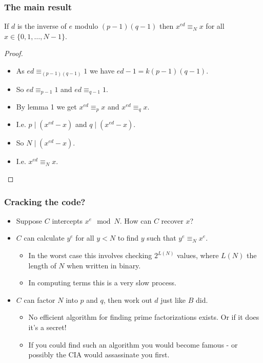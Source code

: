 \documentclass[handout]{beamer}
\begin{document}
\begin{frame}
\frametitle{The main result}
\begin{lemma}
If $d$ is the inverse of $e$ modulo $(p-1)(q-1)$ then $x^{ed} \equiv_N x$ for all $x\in\{0,1,\ldots,N-1\}$.
\end{lemma}
\begin{proof}
\begin{itemize}
\item As $ed\equiv_{(p-1)(q-1)} 1$ we have $ed - 1 = k(p-1)(q-1)$.
\item So $ed \equiv_{p-1} 1$ and  $ed \equiv_{q-1} 1$.
\item By lemma 1 we get $x^{ed}\equiv_p x$ and $x^{ed}\equiv_q x$.
\item I.e. $p\mid(x^{ed} - x)$ and $q\mid (x^{ed} - x)$. 
\item So $N\mid(x^{ed} - x)$.
\item I.e. $x^{ed}\equiv_N x$. 
\end{itemize}
\end{proof}
\end{frame}

\begin{frame}
\frametitle{Cracking the code?}
\begin{itemize}
\item Suppose $C$ intercepts $x^e \mod N$. How can $C$ recover $x$?
\vspace{.5cm}
\item $C$ can calculate $y^e$ for all $y<N$ to find $y$ such that $y^e \equiv_N x^e$.
\begin{itemize}
\item In the worst case this involves checking $2^{L(N)}$ values, where $L(N)$ the length of $N$ when written in binary. 
\item In computing terms this is a very slow process.
\end{itemize}
\vspace{.5cm}
\item $C$ can factor $N$ into $p$ and $q$, then work out $d$ just like $B$ did.
\begin{itemize}
\item No efficient algorithm for finding prime factorizations exists. Or if it does it's a secret!
\item If you could find such an algorithm you would become famous - or possibly the CIA would assassinate you first.
\end{itemize}
\end{itemize}
\end{frame}
\end{document}
